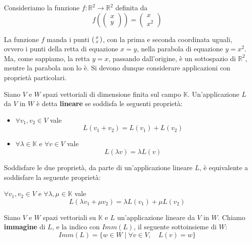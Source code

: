 \begin{example}
	Consideriamo la funzione $\textit{f} : \mathbb{R}^2 \to \mathbb{R}^2$
	definita da
	\begin{equation*}
		\textit{f}\left(
		\begin{pmatrix}
				x \\ y
			\end{pmatrix}
		\right) =
		\begin{pmatrix}
			x \\ x^2
		\end{pmatrix}
	\end{equation*}

	La funzione $f$ manda i punti
	$\begin{psmallmatrix}
			x \\ x
		\end{psmallmatrix}$,
	con la prima e seconda coordinata uguali, ovvero i punti della retta
	di equazione $x = y$, nella parabola di equazione $y = x^2$.
	Ma, come sappiamo, la retta $y = x$, passando dall'origine, \`e un
	sottospazio di $\mathbb{R}^2$, mentre la parabola non lo \`e.
	Si devono dunque considerare applicazioni con propriet\`a particolari.
\end{example}

\begin{definition}
	Siano $V$ e $W$ spazi vettoriali di dimensione finita sul campo
	$\mathbb{K}$. Un'applicazione $L$ da $V$ in $W$ \`e detta
	\textbf{lineare} se soddisfa le seguenti propriet\`a:
	\begin{itemize}
		\item $\forall v_1, v_2 \in V$ vale \[ L(v_1 + v_2) = L(v_1) + L(v_2) \]
		\item
		      $\forall \lambda \in \mathbb{K}$ e $\forall v \in V$
		      vale \[ L(\lambda v) = \lambda L(v) \]
	\end{itemize}
\end{definition}

\begin{observation}
	Soddisfare le due propriet\`a, da parte di un'applicazione lineare $L$,
	\`e equivalente a soddisfare la seguente propriet\`a:

	$\forall v_1, v_2 \in V$ e $\forall \lambda, \mu \in \mathbb{K}$ vale
	\begin{equation*}
		L(\lambda v_1 + \mu v_2) = \lambda L(v_1) + \mu L(v_2)
	\end{equation*}
\end{observation}

\begin{definition}
	Siano $V$ e $W$ spazi vettoriali su $\mathbb{K}$ e $L$ un'applicazione
	lineare da $V$ in $W$. Chiamo \textbf{immagine} di $L$, e la indico con
	$Imm(L)$, il seguente sottoinsieme di $W$:
	\begin{equation*}
		Imm(L) = \{w \in W \mid \forall v \in V, \quad L(v) = w\}
	\end{equation*}
\end{definition}

